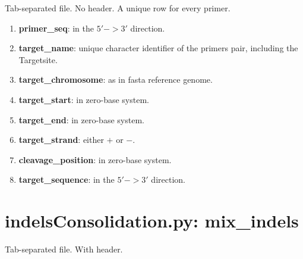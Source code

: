 \documentclass[11pt, twoside]{article}
\begin{document}
Tab-separated file. No header.
A unique row for every primer.

\begin{enumerate}
\item {\bf primer\_seq}: in the $5' -> 3'$ direction.

\item {\bf target\_name}: unique character identifier of the primers
  pair, including the Targetsite.

\item {\bf target_chromosome}: as in fasta reference genome.

\item {\bf target_start}: in zero-base system.

\item {\bf target_end}: in zero-base system.

\item {\bf target_strand}: either $+$ or $-$.

\item {\bf cleavage\_position}: in zero-base system.

\item {\bf target\_sequence}: in the $5' -> 3'$ direction.
\end{enumerate}

\newpage
\section{indelsConsolidation.py: mix\_indels}

Tab-separated file. With header.
\end{document}
